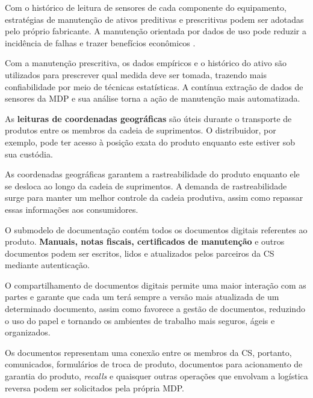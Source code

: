 	Com o histórico de leitura de sensores de cada componente do equipamento, estratégias de manutenção de ativos preditivas e prescritivas podem ser adotadas pelo próprio fabricante. A manutenção orientada por dados de uso pode reduzir a incidência de falhas e trazer benefícios econômicos \cite{odonovan2015maintenance}.
	
	Com a manutenção prescritiva, os dados empíricos e o histórico do ativo são utilizados para prescrever qual medida deve ser tomada, trazendo mais confiabilidade por meio de técnicas estatísticas. A contínua extração de dados de sensores da MDP e sua análise torna a ação de manutenção mais automatizada.
	
	As \textbf{leituras de coordenadas geográficas} são úteis durante o transporte de produtos entre os membros da cadeia de suprimentos. O distribuidor, por exemplo, pode ter acesso à posição exata do produto enquanto este estiver sob sua custódia.
	
	As coordenadas geográficas garantem a rastreabilidade do produto enquanto ele se desloca ao longo da cadeia de suprimentos. A demanda de rastreabilidade surge para manter um melhor controle da cadeia produtiva, assim como repassar essas informações aos consumidores.
	
	O submodelo de documentação contém todos os documentos digitais referentes ao produto. \textbf{Manuais, notas fiscais, certificados de manutenção} e outros documentos podem ser escritos, lidos e atualizados pelos parceiros da CS mediante autenticação.
	
	O compartilhamento de documentos digitais permite uma maior interação com as partes e garante que cada um terá sempre a versão mais atualizada de um determinado documento, assim como favorece a gestão de documentos, reduzindo o uso do papel e tornando os ambientes de trabalho mais seguros, ágeis e organizados.
	
	Os documentos representam uma conexão entre os membros da CS, portanto, comunicados, formulários de troca de produto, documentos para acionamento de garantia do produto, \textit{recalls} e quaisquer outras operações que envolvam a logística reversa podem ser solicitados pela própria MDP.